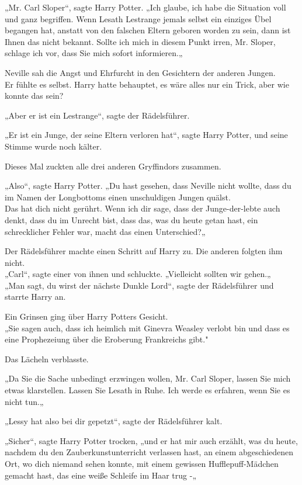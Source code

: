 {„Mr. Carl Sloper“, sagte Harry Potter. „Ich glaube, ich habe die Situation voll und ganz begriffen. Wenn Lesath Lestrange jemals selbst ein einziges Übel begangen hat, anstatt von den falschen Eltern geboren worden zu sein, dann ist Ihnen das nicht bekannt. Sollte ich mich in diesem Punkt irren, Mr. Sloper, schlage ich vor, dass Sie mich sofort informieren.„

Neville sah die Angst und Ehrfurcht in den Gesichtern der anderen Jungen.\\ Er fühlte es selbst. Harry hatte behauptet, es wäre alles nur ein Trick, aber wie konnte das sein?

„Aber er ist ein Lestrange“, sagte der Rädelsführer.

„Er ist ein Junge, der seine Eltern verloren hat“, sagte Harry Potter, und seine Stimme wurde noch kälter.

Dieses Mal zuckten alle drei anderen Gryffindors zusammen.

„Also“, sagte Harry Potter. „Du hast gesehen, dass Neville nicht wollte, dass du im Namen der Longbottoms einen unschuldigen Jungen quälst.\\ Das hat dich nicht gerührt. Wenn ich dir sage, dass der Junge-der-lebte auch denkt, dass du im Unrecht bist, dass das, was du heute getan hast, ein schrecklicher Fehler war, macht das einen Unterschied?„

Der Rädelsführer machte einen Schritt auf Harry zu. Die anderen folgten ihm nicht.\\ „Carl“, sagte einer von ihnen und schluckte. „Vielleicht sollten wir gehen.„\\ „Man sagt, du wirst der nächste Dunkle Lord“, sagte der Rädelsführer und starrte Harry an.

Ein Grinsen ging über Harry Potters Gesicht.\\ „Sie sagen auch, dass ich heimlich mit Ginevra Weasley verlobt bin und dass es eine Prophezeiung über die Eroberung Frankreichs gibt."

Das Lächeln verblasste.

„Da Sie die Sache unbedingt erzwingen wollen, Mr. Carl Sloper, lassen Sie mich etwas klarstellen. Lassen Sie Lesath in Ruhe. Ich werde es erfahren, wenn Sie es nicht tun.„

„Lessy hat also bei dir gepetzt“, sagte der Rädelsführer kalt.

„Sicher“, sagte Harry Potter trocken, „und er hat mir auch erzählt, was du heute, nachdem du den Zauberkunstunterricht verlassen hast, an einem abgeschiedenen Ort, wo dich niemand sehen konnte, mit einem gewissen Hufflepuff-Mädchen gemacht hast, das eine weiße Schleife im Haar trug -„

}
